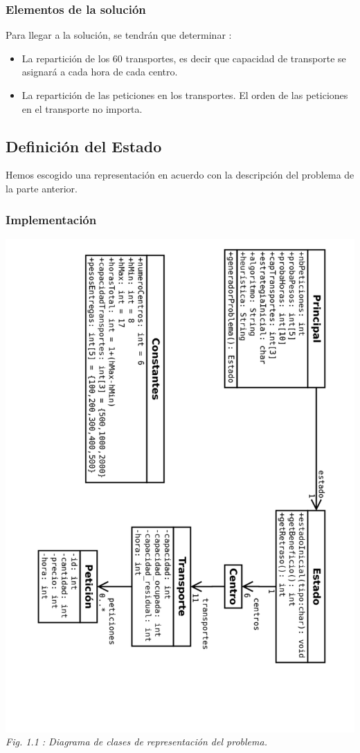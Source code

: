 \documentclass{article}
\begin{document}
\subsubsection{Elementos de la solución}

Para llegar a la solución, se tendrán que determinar :
\begin{itemize}
\item La repartición de los 60 transportes, es decir que capacidad de transporte
se asignará a cada hora de cada centro.
\item La repartición de las peticiones en los transportes. El orden de las
peticiones en el transporte no importa.
\end{itemize}

\subsection{Definición del Estado}

Hemos escogido una representación en acuerdo con la descripción del problema de
la parte anterior.

\subsubsection{Implementación}

\begin{center}
\includegraphics[width=14cm, angle=90]{clases}\\
{\it Fig. 1.1 : Diagrama de clases de representación del problema.} 
\end{center}
\end{document}
